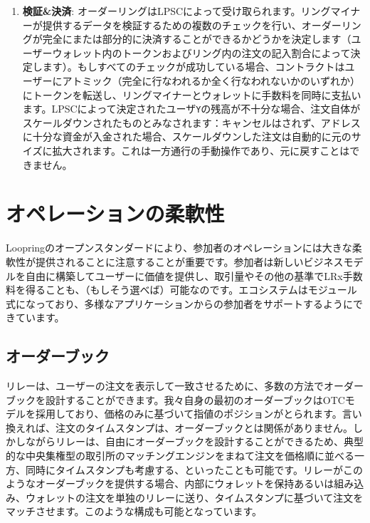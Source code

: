 \documentclass{article}
\makeatletter
\newenvironment{figurehere}
 {\def\@captype{figure}}
 {}
\makeatother
\begin{document}
\begin{multicols}{2}
\begin{enumerate}
\item \textbf{検証\&決済}: オーダーリングはLPSCによって受け取られます。リングマイナーが提供するデータを検証するための複数のチェックを行い、オーダーリングが完全にまたは部分的に決済することができるかどうかを決定します（ユーザーウォレット内のトークンおよびリング内の注文の記入割合によって決定します）。もしすべてのチェックが成功している場合、コントラクトはユーザーにアトミック（完全に行なわれるか全く行なわれないかのいずれか）にトークンを転送し、リングマイナーとウォレットに手数料を同時に支払います。LPSCによって決定されたユーザ\verb|Y|の残高が不十分な場合、注文自体がスケールダウンされたものとみなされます：キャンセルはされず、アドレスに十分な資金が入金された場合、スケールダウンした注文は自動的に元のサイズに拡大されます。これは一方通行の手動操作であり、元に戻すことはできません。


\end{enumerate}





%
%
%

\section{オペレーションの柔軟性\label{sec:business_model}}
Loopringのオープンスタンダードにより、参加者のオペレーションには大きな柔軟性が提供されることに注意することが重要です。参加者は新しいビジネスモデルを自由に構築してユーザーに価値を提供し、取引量やその他の基準でLRx手数料を得ることも、（もしそう選べば）可能なのです。エコシステムはモジュール式になっており、多様なアプリケーションからの参加者をサポートするようにできています。


\subsection{オーダーブック\label{sec:order_book}}
リレーは、ユーザーの注文を表示して一致させるために、多数の方法でオーダーブックを設計することができます。我々自身の最初のオーダーブックはOTCモデルを採用しており、価格のみに基づいて指値のポジションがとられます。言い換えれば、注文のタイムスタンプは、オーダーブックとは関係がありません。しかしながらリレーは、自由にオーダーブックを設計することができるため、典型的な中央集権型の取引所のマッチングエンジンをまねて注文を価格順に並べる一方、同時にタイムスタンプも考慮する、といったことも可能です。リレーがこのようなオーダーブックを提供する場合、内部にウォレットを保持あるいは組み込み、ウォレットの注文を単独のリレーに送り、タイムスタンプに基づいて注文をマッチさせます。このような構成も可能となっています。



\end{multicols}
\end{document}
